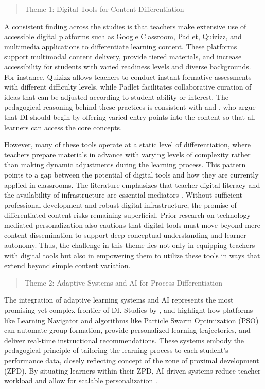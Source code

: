 \documentclass[english]{textolivre}
\begin{document}
\begin{quote}
    Theme 1: Digital Tools for Content Differentiation
\end{quote}

A consistent finding across the studies \cite{halil2024, hasanah2023, malacapay2019, yuen2023} is that teachers make extensive use of accessible digital platforms such as Google Classroom, Padlet, Quizizz, and multimedia applications to differentiate learning content. These platforms support multimodal content delivery, provide tiered materials, and increase accessibility for students with varied readiness levels and diverse backgrounds. For instance, Quizizz allows teachers to conduct instant formative assessments with different difficulty levels, while Padlet facilitates collaborative curation of ideas that can be adjusted according to student ability or interest. The pedagogical reasoning behind these practices is consistent with \textcite{tomlinson1999} and \textcite{annemieke2019}, who argue that DI should begin by offering varied entry points into the content so that all learners can access the core concepts.

However, many of these tools operate at a static level of differentiation, where teachers prepare materials in advance with varying levels of complexity rather than making dynamic adjustments during the learning process. This pattern points to a gap between the potential of digital tools and how they are currently applied in classrooms. The literature emphasizes that teacher digital literacy and the availability of infrastructure are essential mediators \cite{cevikbas2022, engelbrecht2020}. Without sufficient professional development and robust digital infrastructure, the promise of differentiated content risks remaining superficial. Prior research on technology-mediated personalization \cite{shemshack2020} also cautions that digital tools must move beyond mere content dissemination to support deep conceptual understanding and learner autonomy. Thus, the challenge in this theme lies not only in equipping teachers with digital tools but also in empowering them to utilize these tools in ways that extend beyond simple content variation.

\begin{quote}
    Theme 2: Adaptive Systems and AI for Process Differentiation
\end{quote}

The integration of adaptive learning systems and AI represents the most promising yet complex frontier of DI. Studies by \textcite{songer2019, zervoudakis2019}, and \textcite{forster2018} highlight how platforms like Learning Navigator and algorithms like Particle Swarm Optimization (PSO) can automate group formation, provide personalized learning trajectories, and deliver real-time instructional recommendations. These systems embody the pedagogical principle of tailoring the learning process to each student’s performance data, closely reflecting \textcite{vygotsky1978} concept of the zone of proximal development (ZPD). By situating learners within their ZPD, AI-driven systems reduce teacher workload and allow for scalable personalization \cite{celik2022, seo2024}.
\end{document}
